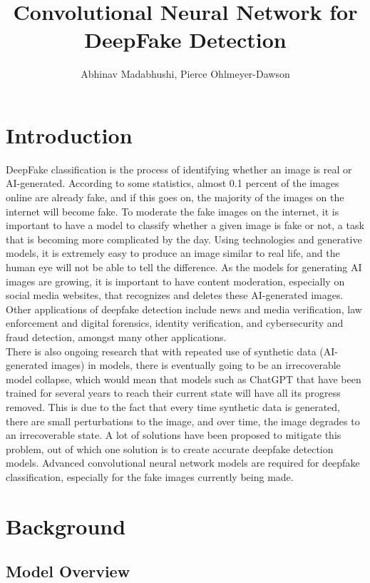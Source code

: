 \documentclass[11pt]{article}
\title{Convolutional Neural Network for DeepFake Detection}
\author{Abhinav Madabhushi, Pierce Ohlmeyer-Dawson}
\date{}
\begin{document}
\maketitle

\abstract{\blindtext}

\section{Introduction}
DeepFake classification is the process of identifying whether an image is real or AI-generated. According to some statistics, almost 0.1 percent of the images online are already fake, and if this goes on, the majority of the images on the internet will become fake. To moderate the fake images on the internet, it is important to have a model to classify whether a given image is fake or not, a task that is becoming more complicated by the day. Using technologies and generative models, it is extremely easy to produce an image similar to real life, and the human eye will not be able to tell the difference. As the models for generating AI images are growing, it is important to have content moderation, especially on social media websites, that recognizes and deletes these AI-generated images. Other applications of deepfake detection include news and media verification, law enforcement and digital forensics, identity verification, and cybersecurity and fraud detection, amongst many other applications. \\

There is also ongoing research that with repeated use of synthetic data (AI-generated images) in models, there is eventually going to be an irrecoverable model collapse, which would mean that models such as ChatGPT that have been trained for several years to reach their current state will have all its progress removed. This is due to the fact that every time synthetic data is generated, there are small perturbations to the image, and over time, the image degrades to an irrecoverable state. A lot of solutions have been proposed to mitigate this problem, out of which one solution is to create accurate deepfake detection models. Advanced convolutional neural network models are required for deepfake classification, especially for the fake images currently being made. 


\section{Background}
\subsection{Model Overview}
\end{document}
